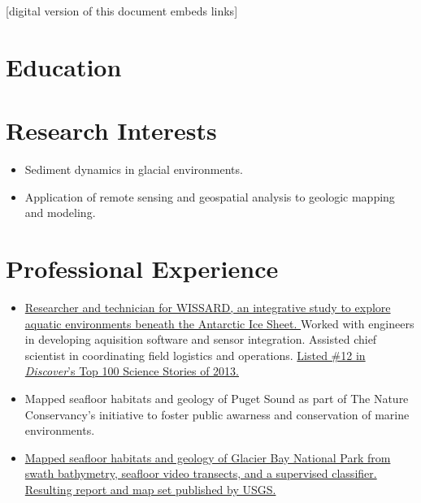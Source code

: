 \documentclass{cv_TOH}
\begin{document}
\vspace{-0.2cm}
\centerline{\footnotesize{[digital version of this document embeds links]}}

\section{Education}

\section{Research Interests}
\begin{itemize}
\item Sediment dynamics in glacial environments.
\item Application of remote sensing and geospatial analysis to geologic mapping and modeling.
\end{itemize}

\section{Professional Experience}

\begin{itemize}
\item \href{http://www.wissard.org}{Researcher and technician for WISSARD, an integrative study to explore aquatic environments beneath the Antarctic Ice Sheet. }Worked with engineers in developing aquisition software and sensor integration. Assisted chief scientist in coordinating field logistics and operations. \href{http://discovermagazine.com/2014/jan-feb/12-the-search-for-life-trapped-under-ice}{Listed \#12 in \textit{Discover}'s Top 100 Science Stories of 2013.}
\item Mapped seafloor habitats and geology of Puget Sound as part of The Nature Conservancy's initiative to foster public awarness and conservation of marine environments.
\item \href{http://pubs.usgs.gov/sim/3253/}{Mapped seafloor habitats and geology of Glacier Bay National Park from swath bathymetry, seafloor video transects, and a supervised classifier. Resulting report and map set published by USGS.}
\end{itemize}
\end{document}
